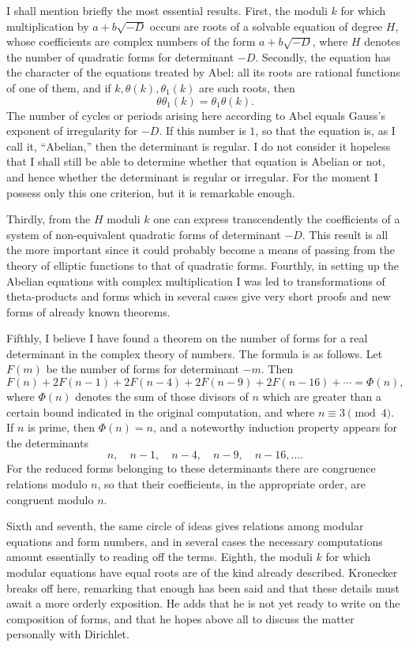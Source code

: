 \documentclass[11pt]{article}
\begin{document}
I shall mention briefly the most essential results. First, the moduli $k$ for which multiplication by $a+b\sqrt{-D}$ occurs are roots of a solvable equation of degree $H$, whose coefficients are complex numbers of the form $a+b\sqrt{-D}$, where $H$ denotes the number of quadratic forms for determinant $-D$. Secondly, the equation has the character of the equations treated by Abel: all its roots are rational functions of one of them, and if $k,\theta(k),\theta_1(k)$ are such roots, then
\[
  \theta\theta_1(k)=\theta_1\theta(k).
\]
The number of cycles or periods arising here according to Abel equals Gauss's exponent of irregularity for $-D$. If this number is $1$, so that the equation is, as I call it, ``Abelian,'' then the determinant is regular. I do not consider it hopeless that I shall still be able to determine whether that equation is Abelian or not, and hence whether the determinant is regular or irregular. For the moment I possess only this one criterion, but it is remarkable enough.

Thirdly, from the $H$ moduli $k$ one can express transcendently the coefficients of a system of non-equivalent quadratic forms of determinant $-D$. This result is all the more important since it could probably become a means of passing from the theory of elliptic functions to that of quadratic forms. Fourthly, in setting up the Abelian equations with complex multiplication I was led to transformations of theta-products and forms which in several cases give very short proofs and new forms of already known theorems.

Fifthly, I believe I have found a theorem on the number of forms for a real determinant in the complex theory of numbers. The formula is as follows. Let $F(m)$ be the number of forms for determinant $-m$. Then
\[
  F(n)+2F(n-1)+2F(n-4)+2F(n-9)+2F(n-16)+\cdots=\Phi(n),
\]
where $\Phi(n)$ denotes the sum of those divisors of $n$ which are greater than a certain bound indicated in the original computation, and where $n\equiv3\pmod4$. If $n$ is prime, then $\Phi(n)=n$, and a noteworthy induction property appears for the determinants
\[
  n,\quad n-1,\quad n-4,\quad n-9,\quad n-16,\ldots.
\]
For the reduced forms belonging to these determinants there are congruence relations modulo $n$, so that their coefficients, in the appropriate order, are congruent modulo $n$.

Sixth and seventh, the same circle of ideas gives relations among modular equations and form numbers, and in several cases the necessary computations amount essentially to reading off the terms. Eighth, the moduli $k$ for which modular equations have equal roots are of the kind already described. Kronecker breaks off here, remarking that enough has been said and that these details must await a more orderly exposition. He adds that he is not yet ready to write on the composition of forms, and that he hopes above all to discuss the matter personally with Dirichlet.
\end{document}
